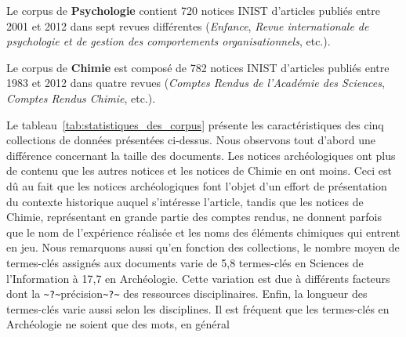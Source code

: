   Le corpus de \textbf{Psychologie} contient 720 notices INIST d'articles
  publiés entre 2001 et 2012 dans sept revues différentes
  (\textit{Enfance}, \textit{Revue internationale de psychologie et de gestion
  des comportements organisationnels}, etc.).

  Le corpus de \textbf{Chimie} est composé de 782 notices INIST d'articles
  publiés entre 1983 et 2012 dans quatre revues (\textit{Comptes Rendus de
  l'Académie des Sciences}, \textit{Comptes Rendus Chimie}, etc.).

  Le tableau~\ref{tab:statistiques_des_corpus} présente les caractéristiques des
  cinq collections de données présentées ci-dessus. Nous observons tout d'abord
  une différence concernant la taille des documents. Les notices archéologiques
  ont plus de contenu que les autres notices et les notices de Chimie en ont
  moins. Ceci est dû au fait que les notices archéologiques font l'objet d'un
  effort de présentation du contexte historique auquel s'intéresse l'article,
  tandis que les notices de Chimie, représentant en grande partie des comptes
  rendus, ne donnent parfois que le nom de l'expérience réalisée et les noms
  des éléments chimiques qui entrent en jeu. Nous remarquons aussi qu'en
  fonction des collections, le nombre moyen de termes-clés assignés aux
  documents varie de 5,8 termes-clés en Sciences de l'Information à 17,7 en
  Archéologie. Cette variation est due à différents facteurs %
  dont la \verb+~?~+précision\verb+~?~+ des ressources disciplinaires.
  Enfin, la longueur des termes-clés varie aussi selon les disciplines. Il est
  fréquent que les termes-clés en Archéologie ne soient que des mots, en général
